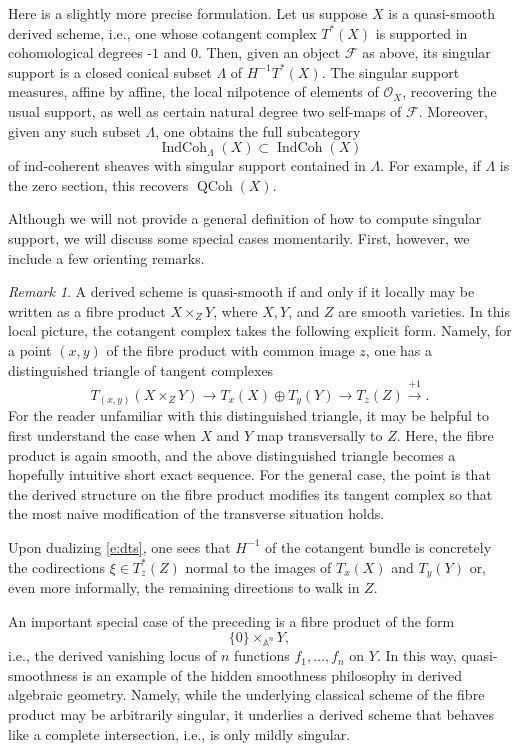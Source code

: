 \documentclass[10pt]{amsart}
\newcommand{\IC}{\on{IndCoh}}
\newcommand{\on}{\operatorname}
\theoremstyle{remark}
\newtheorem{re}[subsubsection]{Remark}
\newcommand{\sF}{\mathscr{F}}
\newcommand{\OO}{\mathscr{O}}
\numberwithin{equation}{section}
\newcommand{\QCoh}{\on{QCoh}}
\begin{document}
Here is a slightly more precise formulation. Let us suppose $X$ is a 
quasi-smooth derived scheme, i.e., one whose cotangent complex $T^*(X)$ is 
supported in 
cohomological degrees -$1$ and $0$. Then, given an object $\sF$ as above, its 
singular support is a closed conical subset $\Lambda$ of $H^{-1} T^*(X)$. The singular support measures, affine by affine, the local nilpotence 
of elements of $\OO_X$, recovering the usual support, as well as certain natural degree two self-maps of $\sF$. Moreover, given any such subset $\Lambda$, one obtains the full subcategory 
%
\[
   \IC_\Lambda(X) \subset \IC(X)
\]
%
of ind-coherent sheaves with singular support contained in $\Lambda$. For 
example, if $\Lambda$ is the zero section, this recovers $\QCoh(X)$. 

Although we will not provide a general definition of how to compute singular 
support, we will discuss some special cases momentarily. First, however, we include a few orienting remarks. 

\begin{re}\label{r:singsupp}A derived scheme is 
quasi-smooth if and 
only if it locally may be written as a fibre product $X \times_Z Y$, where 
$X,Y$, and $Z$ are smooth varieties. In this local picture, the cotangent 
complex takes the following explicit form. Namely, for a point 
$(x,y)$ 
of the fibre product with common image $z$, one has a distinguished triangle of tangent complexes
%
\begin{equation} \label{e:dts}
    T_{(x,y)} (X \times_Z Y) \rightarrow T_x(X) \oplus T_y(Y) \rightarrow 
    T_z(Z) \xrightarrow{+1}.
\end{equation}
%
 For the reader unfamiliar with this distinguished triangle, it may be helpful to first understand the case when $X$ and $Y$ map transversally to $Z$. Here, the fibre product is again smooth, and the above distinguished triangle becomes a hopefully intuitive short exact sequence. For the general case, the point is that the derived structure on the fibre product modifies its tangent complex so that the most naive modification of the transverse situation holds.

Upon dualizing \eqref{e:dts}, one sees that $H^{-1}$ of the cotangent bundle is 
concretely the 
codirections $\xi \in T^*_z(Z)$ normal to the images of $T_x(X)$ and $T_y(Y)$ 
or, even more informally, the remaining directions to walk in $Z$.

An important special case of the preceding is a fibre product of the form \begin{equation} 
\label{e:vanlocus} \{0\} 
\times_{\mathbb{A}^n} Y,\end{equation}i.e., the derived vanishing locus of $n$ 
functions $f_1, \ldots, f_n$ on $Y$.  In 
this way, quasi-smoothness is an example of the hidden smoothness philosophy in 
derived algebraic geometry. Namely, while the underlying classical scheme of 
the fibre product may be arbitrarily singular, it underlies a derived scheme 
that behaves like a complete intersection, i.e., is only mildly singular.
 
\end{re}
\end{document}
